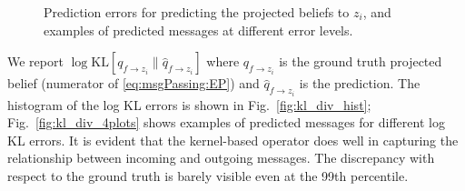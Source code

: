 \documentclass[english]{article}
\theoremstyle{plain}
\theoremstyle{plain}
\newcommand{\factor}{f}				%
\newcommand{\aenote}[1]{}
\newcommand{\figref}[1]{Fig.~\ref{#1}}
\begin{document}
\begin{figure}[ht]
  \centering

  \caption{Prediction errors for predicting the projected beliefs to $z_i$, and examples of predicted messages at different error levels. 
  }
  \label{fig:kl_div}
\end{figure}


We report 
$\log \mathrm{KL}[q_{\factor \rightarrow z_i} \| \hat{q}_{\factor \rightarrow z_i}]$ 
where $q_{\factor \rightarrow z_i}$ is the ground truth projected belief (numerator of  \eqref{eq:msgPassing:EP}) and 
$\hat{q}_{\factor \rightarrow z_i}$ is the prediction.
The histogram of the log KL errors is shown in \figref{fig:kl_div_hist}; \figref{fig:kl_div_4plots} shows examples of predicted messages 
for different log KL errors. 
It is evident that the kernel-based operator does well in capturing the relationship
between incoming and outgoing messages. The discrepancy with respect to the ground truth is barely 
visible even at the 99th percentile.
\end{document}
